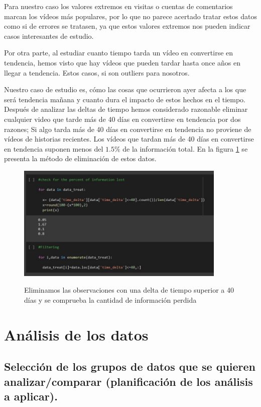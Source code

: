 \documentclass[a4paper,12pt]{article}
\begin{document}
Para nuestro caso los valores extremos en visitas o cuentas de comentarios marcan los v\'ideos m\'as populares, por lo que no parece acertado tratar estos datos como si de errores se tratasen, ya que estos valores extremos nos pueden indicar casos interesantes de estudio. 

Por otra parte, al estudiar cuanto tiempo tarda un v\'ideo en convertirse  en tendencia, hemos visto que hay v\'ideos que pueden tardar hasta once a\~nos en llegar a tendencia. Estos casos, si son outliers  para nosotros. 

Nuestro caso de estudio es, c\'omo las cosas que ocurrieron ayer afecta a los que ser\'a tendencia ma\~nana y cuanto dura el impacto de estos hechos en el tiempo. Despu\'es de analizar las deltas de tiempo hemos considerado razonable eliminar cualquier video que tarde m\'as de 40 d\'ias en convertirse en tendencia por dos razones; Si algo tarda m\'as de 40 d\'ias en convertirse en tendencia no proviene de v\'ideos de historias recientes. Los v\'ideos que tardan m\'as de 40 d\'ias en convertirse en tendencia suponen menos del $1.5\%$ de la informaci\'on total. En la figura \ref{fig:delta} se presenta la m\'etodo de eliminaci\'on de estos datos.

\begin{figure}[h!]
\centering
\includegraphics[width=10cm]{tiempo.JPG}\\
\caption{Eliminamos las observaciones con una delta de tiempo superior a 40 d\'ias y se comprueba la cantidad de informaci\'on perdida}
\label{fig:delta}
\end{figure}

\section{An\'alisis de los datos}

\subsection{Selecci\'on de los grupos de datos que se quieren analizar/comparar (planificaci\'on de los an\'alisis a aplicar).}
\end{document}
